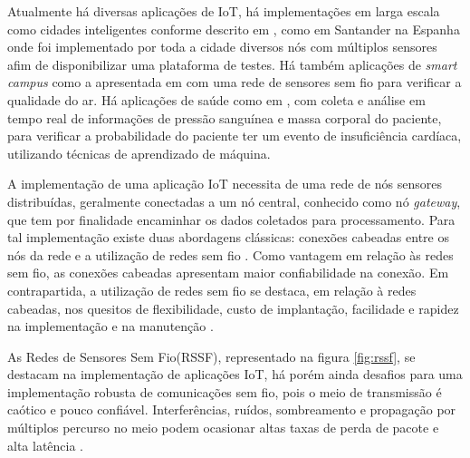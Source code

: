Atualmente há diversas aplicações de IoT, há implementações em larga escala como cidades inteligentes conforme descrito em \cite{sotres2017practical}, como em Santander na Espanha onde foi implementado por toda a cidade diversos nós com múltiplos sensores afim de disponibilizar uma plataforma de testes. Há também aplicações de \emph{smart campus} como a apresentada em \cite{wang2017performance} com uma rede de sensores sem fio para verificar a qualidade do ar. Há aplicações de saúde como em \cite{zhang2015remote}, com coleta e análise em tempo real de informações de pressão sanguínea e massa corporal do paciente, para verificar a probabilidade do paciente ter um evento de insuficiência cardíaca, utilizando técnicas de aprendizado de máquina.


A implementação de uma aplicação IoT necessita de uma rede de nós sensores distribuídas, geralmente conectadas a um nó central, conhecido como nó \emph{gateway}, que tem por finalidade encaminhar os dados coletados para processamento. Para tal implementação existe duas abordagens clássicas: conexões cabeadas entre os nós da rede e a utilização de redes sem fio \cite{gomes2017estimaccao}. Como vantagem em relação às redes sem fio, as conexões cabeadas apresentam maior confiabilidade na conexão. Em contrapartida, a utilização de redes sem fio se destaca, em relação à redes cabeadas, nos quesitos de flexibilidade, custo de implantação, facilidade e rapidez na implementação e na manutenção \cite{gungor2009industrial}.

As Redes de Sensores Sem Fio(RSSF), representado na figura \ref{fig:rssf}, se destacam na implementação de aplicações IoT, há porém ainda desafios para uma implementação robusta de comunicações sem fio, pois o meio de transmissão é caótico e pouco confiável. Interferências, ruídos, sombreamento e propagação por múltiplos percurso no meio podem ocasionar altas taxas de perda de pacote e alta latência \cite{gomes2017estimaccao}.

